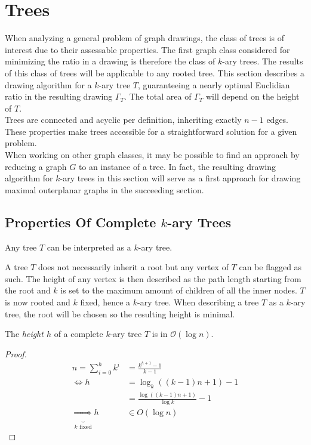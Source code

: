 \section{Trees}\label{s:k-ary_trees}
When analyzing a general problem of graph drawings, the class of trees is of interest due to their assessable properties. The first graph class considered for minimizing the ratio in a drawing is therefore the class of $k$-ary trees. The results of this class of trees will be applicable to any rooted tree. This section describes a drawing algorithm for a $k$-ary tree $T$, guaranteeing a nearly optimal Euclidian ratio in the resulting drawing $\Gamma_T$. The total area of $\Gamma_T$ will depend on the height of $T$.\\
Trees are connected and acyclic per definition, inheriting exactly $n-1$ edges. These properties make trees accessible for a straightforward solution for a given problem.\\
When working on other graph classes, it may be possible to find an approach by reducing a graph $G$ to an instance of a tree. In fact, the resulting drawing algorithm for $k$-ary trees in this section will serve as a first approach for drawing maximal outerplanar graphs in the succeeding section.
\subsection{Properties Of Complete $k$-ary Trees}
\begin{lemma}\label{l:tree_to_k-ary}
	Any tree $T$ can be interpreted as a $k$-ary tree.
\end{lemma}
A tree $T$ does not necessarily inherit a root but any vertex of $T$ can be flagged as such. The height of any vertex is then described as the path length starting from the root and $k$ is set to the maximum amount of children of all the inner nodes. $T$ is now rooted and $k$ fixed, hence a $k$-ary tree. When describing a tree $T$ as a $k$-ary tree, the root will be chosen so the resulting height is minimal.
\begin{lemma}The \emph{height $h$} of a complete $k$-ary tree $T$ is in $\mathcal{O}(\log n)$.\label{l:k-ary-tree_log_height}
\end{lemma}
\begin{proof}
	\begin{align}
		n = \sum_{i=0}^{h}k^i &= \frac{k^{h+1}-1}{k-1}\\
		\Leftrightarrow h &= \log_k((k-1)n+1)-1\\
		&= \frac{\log((k-1)n+1)}{\log k}-1\\
		\underbrace{\Rightarrow}_{k \text{ fixed}}h &\in O(\log n)
	\end{align}
\end{proof}

